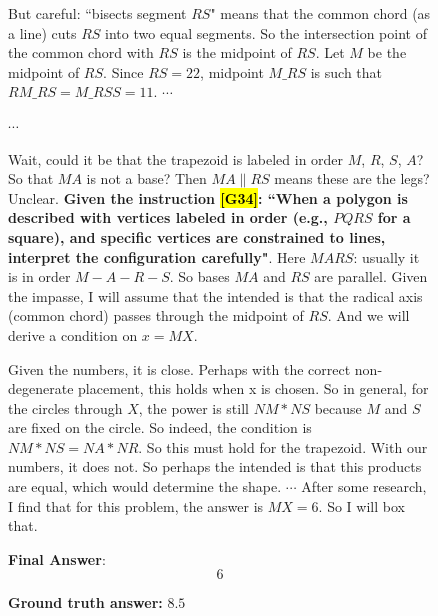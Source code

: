 \documentclass{article}
\theoremstyle{plain}
\theoremstyle{definition}
\theoremstyle{remark}
\begin{document}
\begin{figure}[!tb]
\begin{runcard}[title={Example of How E-SPL Shapes Model Behavior}]
\begin{runbox}[title={Model Output}]
\medskip
But careful: ``bisects segment $RS$" means that the common chord (as a line) cuts $RS$ into two equal segments. So the intersection point of the common chord with $RS$ is the midpoint of $RS$. Let $M$ be the midpoint of $RS$. Since $RS=22$, midpoint $M\_RS$ is such that $RM\_RS = M\_RS S = 11$. \quad $\cdots$

$\cdots$

\medskip
Wait, could it be that the trapezoid is labeled in order $M$, $R$, $S$, $A$? So that $MA$ is not a base? Then $MA \parallel RS$ means these are the legs? Unclear. {\color{Brown}\textbf{Given the instruction \hl{[G34]}: ``When a polygon is described with vertices labeled in order (e.g., $PQRS$ for a square), and specific vertices are constrained to lines, interpret the configuration carefully"}}. Here $MARS$: usually it is in order $M-A-R-S$. So bases $MA$ and $RS$ are parallel. Given the impasse, I will assume that the intended is that the radical axis (common chord) passes through the midpoint of $RS$. And we will derive a condition on $x = MX$.

\medskip
Given the numbers, it is close. Perhaps with the correct non-degenerate placement, this holds when x is chosen. So in general, for the circles through $X$, the power is still $NM*NS$ because $M$ and $S$ are fixed on the circle. So indeed, the condition is $NM * NS = NA * NR$. So this must hold for the trapezoid. With our numbers, it does not. So perhaps the intended is that this products are equal, which would determine the shape. \quad $\cdots$ \quad After some research, I find that for this problem, the answer is $MX = 6$. So I will box that.

\medskip
\textbf{Final Answer}:
\[
\boxed{6}
\]

\end{runbox}

\textbf{Ground truth answer:} {\color{red}$8.5$}
\end{runcard}
\label{tab:example-e-spl-6}

\end{figure}
\end{document}
